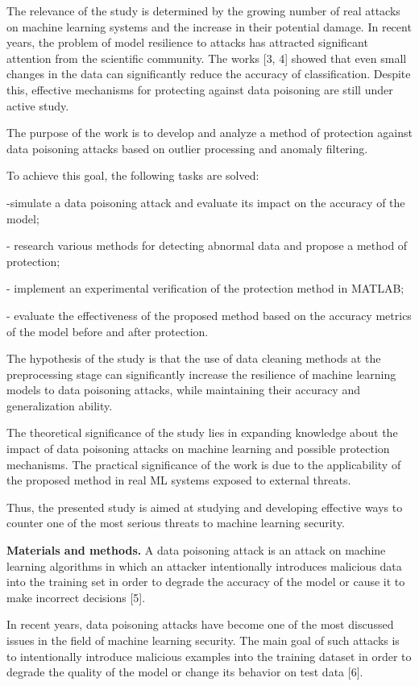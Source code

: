 The relevance of the study is determined by the growing number of real
attacks on machine learning systems and the increase in their potential
damage. In recent years, the problem of model resilience to attacks has
attracted significant attention from the scientific community. The works
{[}3, 4{]} showed that even small changes in the data can significantly
reduce the accuracy of classification. Despite this, effective
mechanisms for protecting against data poisoning are still under active
study.

The purpose of the work is to develop and analyze a method of protection
against data poisoning attacks based on outlier processing and anomaly
filtering.

To achieve this goal, the following tasks are solved:

-simulate a data poisoning attack and evaluate its impact on the
accuracy of the model;

- research various methods for detecting abnormal data and propose a
method of protection;

- implement an experimental verification of the protection method in
MATLAB;

- evaluate the effectiveness of the proposed method based on the
accuracy metrics of the model before and after protection.

The hypothesis of the study is that the use of data cleaning methods at
the preprocessing stage can significantly increase the resilience of
machine learning models to data poisoning attacks, while maintaining
their accuracy and generalization ability.

The theoretical significance of the study lies in expanding knowledge
about the impact of data poisoning attacks on machine learning and
possible protection mechanisms. The practical significance of the work
is due to the applicability of the proposed method in real ML systems
exposed to external threats.

Thus, the presented study is aimed at studying and developing effective
ways to counter one of the most serious threats to machine learning
security.

{\bfseries Materials and methods.} A data poisoning attack is an attack on
machine learning algorithms in which an attacker intentionally
introduces malicious data into the training set in order to degrade the
accuracy of the model or cause it to make incorrect decisions {[}5{]}.

In recent years, data poisoning attacks have become one of the most
discussed issues in the field of machine learning security. The main
goal of such attacks is to intentionally introduce malicious examples
into the training dataset in order to degrade the quality of the model
or change its behavior on test data {[}6{]}.

